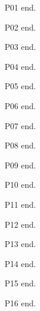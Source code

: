 P01 \parencite[12]{c1} end.

P02 \parencite[12--15]{c1} end.

P03 \parencite[12-15]{c1} end.

P04 \parencite[chap.~3]{c1} end.

P05 \parencite[e1001]{c1} end.

P06 \parencite[xii]{c1} end.

P07 \parencite[see][12]{c1} end.

P08 \textcite[45]{c1} end.

P09 \cite[7, 9]{c1} end.

P10 \parencite[12]{c2} end.

P11 \parencite[12--13]{c2} end.

P12 \parencite[12]{c3} end.

P13 \parencite[3]{c4} end.

P14 \textcite[45]{c1,c2} end.

P15 \parencite[12f.]{c1} end.

P16 \parencite[12;14]{c1} end.
